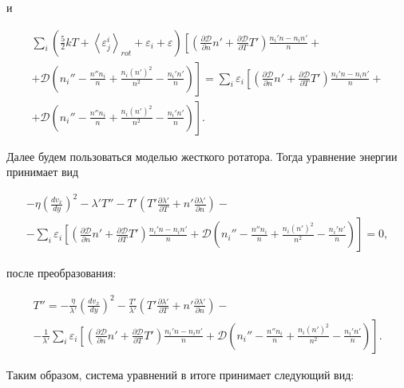 \documentclass[12pt]{article}
\begin{document}
и

\begin{multline}
   \sum_{i} \left(\frac{5}{2}kT + \left<\varepsilon^{i}_{j} \right>_{rot} + \varepsilon_{i} + \varepsilon \right) \left[\left(\frac{\partial \mathcal{D}}{\partial n}n' + \frac{\partial \mathcal{D}}{\partial T}T' \right) \frac{n_{i}'n - n_{i}n'}{n} \right. + \\
  + \left. \mathcal{D}\left(n_{i}'' - \frac{n''n_{i}}{n} + \frac{n_{i}\left(n'\right)^2}{n^2} - \frac{n_{i}'n'}{n} \right)  \right] =  \sum_{i}\varepsilon_{i} \left[\left(\frac{\partial \mathcal{D}}{\partial n}n' + \frac{\partial \mathcal{D}}{\partial T}T' \right) \frac{n_{i}'n - n_{i}n'}{n} \right. + \\
  + \left. \mathcal{D}\left(n_{i}'' - \frac{n''n_{i}}{n} + \frac{n_{i}\left(n'\right)^2}{n^2} - \frac{n_{i}'n'}{n} \right)  \right].
\end{multline}

Далее будем пользоваться моделью жесткого ротатора. Тогда уравнение энергии принимает вид

\begin{multline}
  - \eta \left(\frac{d v_{x}}{d y} \right)^2 -\lambda' T'' - T' \left(T' \frac{\partial \lambda'}{\partial T} + n' \frac{\partial \lambda'}{\partial n} \right) - \\
  - \sum_{i}\varepsilon_{i} \left[\left(\frac{\partial \mathcal{D}}{\partial n}n' + \frac{\partial \mathcal{D}}{\partial T}T' \right) \frac{n_{i}'n - n_{i}n'}{n} \right. + \left. \mathcal{D}\left(n_{i}'' - \frac{n''n_{i}}{n} + \frac{n_{i}\left(n'\right)^2}{n^2} - \frac{n_{i}'n'}{n} \right)  \right] = 0,
\end{multline}

после преобразования:

\begin{multline}
  T'' = -\frac{\eta}{\lambda'} \left(\frac{d v_{x}}{d y} \right)^2 - \frac{T'}{\lambda'} \left(T' \frac{\partial \lambda'}{\partial T} + n' \frac{\partial \lambda'}{\partial n} \right) - \\
  - \frac{1}{\lambda'}\sum_{i}\varepsilon_{i} \left[\left(\frac{\partial \mathcal{D}}{\partial n}n' + \frac{\partial \mathcal{D}}{\partial T}T' \right) \frac{n_{i}'n - n_{i}n'}{n} \right. + \left. \mathcal{D}\left(n_{i}'' - \frac{n''n_{i}}{n} + \frac{n_{i}\left(n'\right)^2}{n^2} - \frac{n_{i}'n'}{n} \right)  \right].
\end{multline}

Таким образом, система уравнений в итоге принимает следующий вид:
\end{document}
